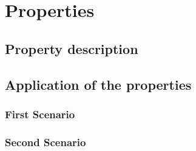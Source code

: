\section{Properties}

\subsection{Property description}

\subsection{Application of the properties}

\subsubsection{First Scenario}


\subsubsection{Second Scenario}